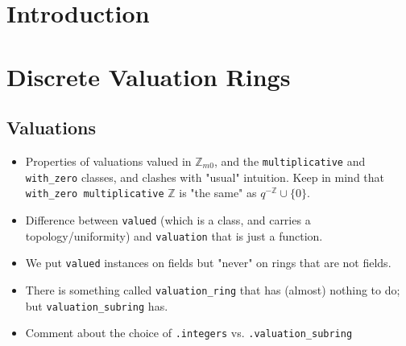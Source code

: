 \documentclass[sigplan,10pt,anonymous,review]{acmart}\settopmatter{printfolios=true,printccs=false,printacmref=false}
\newcommand*{\ZZ}{\mathbb{Z}}
\begin{document}





\maketitle

\section{Introduction}
\section {Discrete Valuation Rings}
\subsection{Valuations}
\begin{itemize}
	\item Properties of valuations valued in $\ZZ_{m0}$, and the \texttt{multiplicative} and \texttt{with\_zero} classes, and clashes with "usual" intuition. Keep in mind that \texttt{with\_zero multiplicative} $\ZZ$ is "the same" as $q^{-\ZZ}\cup \{0\}$.
	\item Difference between \texttt{valued} (which is a class, and carries a topology/uniformity) and \texttt{valuation} that is just a function.
	\item We put \texttt{valued} instances on fields but "never" on rings that are not fields.
	\item There is something called \texttt{valuation\_ring} that has (almost) nothing to do; but \texttt{valuation\_subring} has.
	\item Comment about the choice of \texttt{.integers} vs. \texttt{.valuation\_subring}
\end{itemize}
\end{document}
